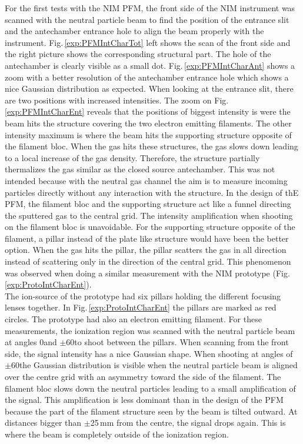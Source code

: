 	For the first tests with the NIM PFM, the front side of the NIM instrument was scanned with the neutral particle beam to find the position of the entrance slit and the antechamber entrance hole to align the beam properly with the instrument. Fig.\,\ref{exp:PFMIntCharTot} left shows the scan of the front side and the right picture shows the corresponding structural part. The hole of the antechamber is clearly visible as a small dot. Fig.\,\ref{exp:PFMIntCharAnt} shows a zoom with a better resolution of the antechamber entrance hole which shows a nice Gaussian distribution as expected. When looking at the entrance slit, there are two positions with increased intensities. The zoom on Fig.\,\ref{exp:PFMIntCharEnt} reveals that the positions of biggest intensity is were the beam hits the structure covering the two electron emitting filaments. The other intensity maximum is where the beam hits the supporting structure opposite of the filament bloc. When the gas hits these structures, the gas slows down leading to a local increase of the gas density. Therefore, the structure partially thermalizes the gas similar as the closed source antechamber. This was not intended because with the neutral gas channel the aim is to measure incoming particles directly without any interaction with the structure. In the design of thE PFM, the filament bloc and the supporting structure act like a funnel directing the sputtered gas to the central grid. The intensity amplification when shooting on the filament bloc is unavoidable. For the supporting structure opposite of the filament, a pillar instead of the plate like structure would have been the better option. When the gas hits the pillar, the pillar scatters the gas in all direction instead of scattering only in the direction of the central grid. This phenomenon was observed when doing a similar measurement with the NIM prototype (Fig.\,\ref{exp:ProtoIntCharEnt}).\\
	The ion-source of the prototype had six pillars holding the different focusing lenses together. In Fig.\,\ref{exp:ProtoIntCharEnt} the pillars are marked as red circles. The prototype had also an electron emitting filament. For these measurements, the ionization region was scanned with the neutral particle beam at angles 0\degree and $\pm$60\degree to shoot between the pillars. When scanning from the front side, the signal intensity has a nice Gaussian shape. When shooting at angles of $\pm$60\degree the Gaussian distribution is visible when the neutral particle beam is aligned over the centre grid with an asymmetry toward the side of the filament. The filament bloc slows down the neutral particles leading to a small amplification of the signal. This amplification is less dominant than in the design of the PFM because the part of the filament structure seen by the beam is tilted outward. At distances bigger than $\pm$25\,mm from the centre, the signal drops again. This is where the beam is completely outside of the ionization region.
